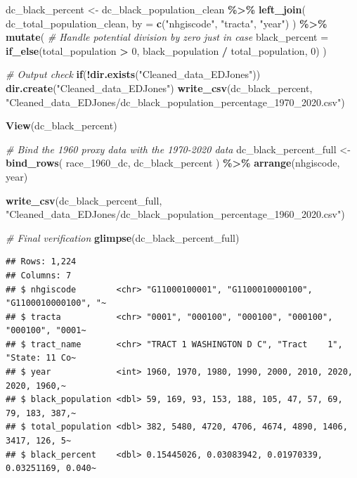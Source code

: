 \documentclass[
]{article}
\newenvironment{Shaded}{\begin{snugshade}}{\end{snugshade}}
\newcommand{\AttributeTok}[1]{\textcolor[rgb]{0.13,0.29,0.53}{#1}}
\newcommand{\CommentTok}[1]{\textcolor[rgb]{0.56,0.35,0.01}{\textit{#1}}}
\newcommand{\ControlFlowTok}[1]{\textcolor[rgb]{0.13,0.29,0.53}{\textbf{#1}}}
\newcommand{\DecValTok}[1]{\textcolor[rgb]{0.00,0.00,0.81}{#1}}
\newcommand{\FunctionTok}[1]{\textcolor[rgb]{0.13,0.29,0.53}{\textbf{#1}}}
\newcommand{\NormalTok}[1]{#1}
\newcommand{\OtherTok}[1]{\textcolor[rgb]{0.56,0.35,0.01}{#1}}
\newcommand{\SpecialCharTok}[1]{\textcolor[rgb]{0.81,0.36,0.00}{\textbf{#1}}}
\newcommand{\StringTok}[1]{\textcolor[rgb]{0.31,0.60,0.02}{#1}}
\begin{document}
\begin{Shaded}
\begin{Highlighting}[]
\NormalTok{dc\_black\_percent }\OtherTok{\textless{}{-}}\NormalTok{ dc\_black\_population\_clean }\SpecialCharTok{\%\textgreater{}\%}
  \FunctionTok{left\_join}\NormalTok{(}
\NormalTok{    dc\_total\_population\_clean,}
    \AttributeTok{by =} \FunctionTok{c}\NormalTok{(}\StringTok{"nhgiscode"}\NormalTok{, }\StringTok{"tracta"}\NormalTok{, }\StringTok{"year"}\NormalTok{)}
\NormalTok{  ) }\SpecialCharTok{\%\textgreater{}\%}
  \FunctionTok{mutate}\NormalTok{(}
    \CommentTok{\# Handle potential division by zero just in case}
    \AttributeTok{black\_percent =} \FunctionTok{if\_else}\NormalTok{(total\_population }\SpecialCharTok{\textgreater{}} \DecValTok{0}\NormalTok{, black\_population }\SpecialCharTok{/}\NormalTok{ total\_population, }\DecValTok{0}\NormalTok{)}
\NormalTok{  )}

\CommentTok{\# Output check}
\ControlFlowTok{if}\NormalTok{(}\SpecialCharTok{!}\FunctionTok{dir.exists}\NormalTok{(}\StringTok{"Cleaned\_data\_EDJones"}\NormalTok{)) }\FunctionTok{dir.create}\NormalTok{(}\StringTok{"Cleaned\_data\_EDJones"}\NormalTok{)}
\FunctionTok{write\_csv}\NormalTok{(dc\_black\_percent, }\StringTok{"Cleaned\_data\_EDJones/dc\_black\_population\_percentage\_1970\_2020.csv"}\NormalTok{)}

\FunctionTok{View}\NormalTok{(dc\_black\_percent)}
\end{Highlighting}
\end{Shaded}

\begin{Shaded}
\begin{Highlighting}[]
\CommentTok{\# Bind the 1960 proxy data with the 1970{-}2020 data}
\NormalTok{dc\_black\_percent\_full }\OtherTok{\textless{}{-}} \FunctionTok{bind\_rows}\NormalTok{(}
\NormalTok{  race\_1960\_dc,}
\NormalTok{  dc\_black\_percent        }
\NormalTok{) }\SpecialCharTok{\%\textgreater{}\%}
  \FunctionTok{arrange}\NormalTok{(nhgiscode, year)}

\FunctionTok{write\_csv}\NormalTok{(dc\_black\_percent\_full, }\StringTok{"Cleaned\_data\_EDJones/dc\_black\_population\_percentage\_1960\_2020.csv"}\NormalTok{)}

\CommentTok{\# Final verification}
\FunctionTok{glimpse}\NormalTok{(dc\_black\_percent\_full)}
\end{Highlighting}
\end{Shaded}

\begin{verbatim}
## Rows: 1,224
## Columns: 7
## $ nhgiscode        <chr> "G11000100001", "G1100010000100", "G1100010000100", "~
## $ tracta           <chr> "0001", "000100", "000100", "000100", "000100", "0001~
## $ tract_name       <chr> "TRACT 1 WASHINGTON D C", "Tract    1", "State: 11 Co~
## $ year             <int> 1960, 1970, 1980, 1990, 2000, 2010, 2020, 2020, 1960,~
## $ black_population <dbl> 59, 169, 93, 153, 188, 105, 47, 57, 69, 79, 183, 387,~
## $ total_population <dbl> 382, 5480, 4720, 4706, 4674, 4890, 1406, 3417, 126, 5~
## $ black_percent    <dbl> 0.15445026, 0.03083942, 0.01970339, 0.03251169, 0.040~
\end{verbatim}
\end{document}

